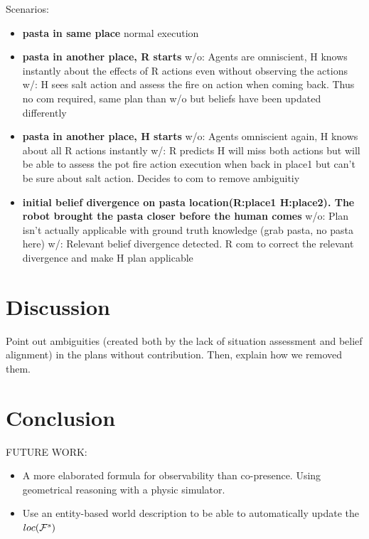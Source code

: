 \documentclass[letterpaper]{article} %
\begin{document}
Scenarios:
\begin{itemize}
    \item \textbf{pasta in same place}
        normal execution
    
    \item \textbf{pasta in another place, R starts}
        w/o: Agents are omniscient, H knows instantly about the effects of R actions even without observing the actions
        w/: H sees salt action and assess the fire on action when coming back. Thus no com required, same plan than w/o but beliefs have been updated differently
        
    \item \textbf{pasta in another place, H starts}
        w/o: Agents omniscient again, H knows about all R actions instantly
        \subitem w/: R predicts H will miss both actions but will be able to assess the pot fire action execution when back in place1 but can't be sure about salt action. Decides to com to remove ambiguitiy
    
    \item \textbf{initial belief divergence on pasta location(R:place1 H:place2). The robot brought the pasta closer before the human comes}
        \subitem w/o: Plan isn't actually applicable with ground truth knowledge (grab pasta, no pasta here)
        \subitem w/: Relevant belief divergence detected. R com to correct the relevant divergence and make H plan applicable
    
    
\end{itemize}

\section{Discussion}

Point out ambiguities (created both by the lack of situation assessment and belief alignment) in the plans without contribution. Then, explain how we removed them. 

\section{Conclusion}

FUTURE WORK:
\begin{itemize}
    \item A more elaborated formula for observability than co-presence. Using geometrical reasoning with a physic simulator.
    \item Use an entity-based world description to be able to automatically update the $loc(\mathcal{F}^{s}_{})$
\end{itemize}


\end{document}
